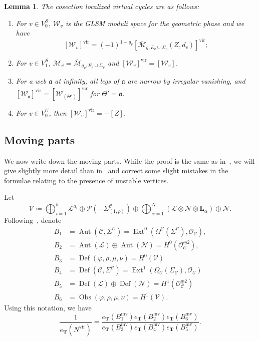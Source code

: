 \documentclass{amsart}
\newtheorem{lem}[thm]{Lemma}
\theoremstyle{definition}
\theoremstyle{remark}
\theoremstyle{plain}
\theoremstyle{definition}
\theoremstyle{remark}
\newcommand{\T}{\mathbf{T}}
\newcommand{\mc}[1]{\mathcal{#1}}
\newcommand{\mf}[1]{\mathfrak{#1}}
\newcommand{\mbf}[1]{\mathbf{#1}}
\newcommand{\mr}[1]{\mathrm{#1}}
\newcommand{\on}[1]{\operatorname{#1}}
\newcommand{\ol}[1]{\overline{#1}}
\newcommand{\1}{\mathbf{1}}
\newcommand{\2}{\mathbf{2}}
\newcommand{\3}{\mathbf{3}}
\newcommand{\vir}{\mr{vir}}
\newcommand{\mv}{\mr{mv}}
\DeclareMathOperator{\Ext}{Ext}
\DeclareMathOperator{\Aut}{Aut}
\begin{document}
\begin{lem}
    The cosection localized virtual cycles are as follows:
    \begin{enumerate}
        \item For $v \in V_0^S$, $\mc{W}_v$ is the GLSM moduli space for the geometric phase and we have
            \[ [\mc{W}_v]^{\vir} = (-1)^{1-g_v} [\ol{\mc{M}}_{g,E_v \cup \Sigma_v}(Z, d_v)]^{\vir}; \]
        \item For $v \in V_1^S$, $\mc{M}_v = \ol{\mc{M}}_{g_v, E_v \cup \Sigma_v}$ and $[\mc{W}_v]^{\vir} = [\mc{W}_v]$.
        \item For a web $\mf{a}$ at infinity, all legs of $\mf{a}$ are narrow by irregular vanishing, and $[\mc{W}_{\mf{a}}]^{\vir} = [\mc{W}_{(\Theta')}]^{\vir}$ for $\Theta' = \mf{a}$.
        \item For $v \in V_0^U$, then $[\mc{W}_v]^{\vir} = -[Z]$.
    \end{enumerate}
\end{lem}

\subsection{Moving parts}%
\label{sub:Moving parts}

We now write down the moving parts. While the proof is the same as in~\cite{msp2,nmsp}, we will give slightly more detail than in~\cite[\S 6]{nmsp} and correct some slight mistakes in the formulae relating to the presence of unstable vertices.

Let
\[ \mc{V} \coloneqq \bigoplus_{i=1}^5 \mc{L}^{a_i} \oplus \mc{P}(-\Sigma^{\mc{C}}_{(1,\rho)}) \oplus \bigoplus_{\alpha=1}^N (\mc{L} \otimes \mc{N} \otimes \mbf{L}_{\alpha}) \oplus \mc{N}. \]
Following~\cite[\S 4]{msp2}, denote
\begin{align*}
    B_1 &= \Aut(\mc{C}, \Sigma^{\mc{C}}) = \Ext^0(\Omega^{\mc{C}}(\Sigma^{\mc{C}}), \mc{O}_{\mc{C}}), \\
    B_2 &= \Aut(\mc{L}) \oplus \Aut(\mc{N}) = H^0(\mc{O}_{\mc{C}}^{\oplus 2}), \\
    B_3 &= \on{Def}(\varphi, \rho, \mu, \nu) = H^0(\mc{V}) \\
    B_4 &= \on{Def}(\mc{C}, \Sigma^{\mc{C}}) = \Ext^1(\Omega_{\mc{C}}(\Sigma_{\mc{C}}), \mc{O}_{\mc{C}}) \\
    B_5 &= \on{Def}(\mc{L}) \oplus \on{Def}(\mc{N}) = H^1(\mc{O}_{\mc{C}}^{\oplus 2}) \\
    B_6 &= \on{Obs}(\varphi, \rho, \mu, \nu) = H^1(\mc{V}).
\end{align*}
Using this notation, we have
\[ \frac{1}{e_{\T}(N^{\vir})} = \frac{e_{\T}(B_1^{\mv}) e_{\T}(B_2^{\mv}) e_{\T}(B_6^{\mv})}{e_{\T}(B_3^{\mv}) e_{\T}(B_4^{\mv}) e_{\T}(B_5^{\mv})}. \]
\end{document}
